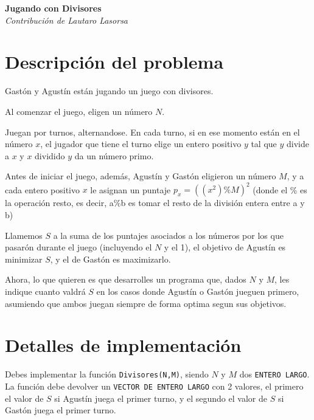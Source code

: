 \documentclass[fontsize=13pt, paper=a4, DIV=calc]{scrartcl}
\renewcommand*{\maketitle}{
	\begin{center}
		\textbf{\nombre}\\
		\textit{\footnotesize Contribución de \author}
	\end{center}
}
\begin{document}
\def\contest{OIA Certamen Nacional Nivel 3}
\def\nombre{Jugando con Divisores}
\def\author{Lautaro Lasorsa}
\def\niveldia{}
\def\numero{}
\def\archivo{divisores}%
\def\version{}


\maketitle
\begin{multicols*}{2}

\section{Descripción del problema}

Gastón y Agustín están jugando un juego con divisores.

Al comenzar el juego, eligen un número $N$. 

Juegan por turnos, alternandose. En cada turno, si en ese momento están en el número $x$, el jugador que tiene el turno elige un entero positivo $y$ tal que $y$ divide a $x$ y $x$ dividido $y$ da un número primo.

Antes de iniciar el juego, además, Agustín y Gastón eligieron un número $M$, y a cada entero positivo $x$ le asignan un puntaje $ p_x = ((x^2)\%M)^2 $ (donde el  \% es la operación resto, es decir, a\%b es tomar el resto de la división entera entre a y b)

Llamemos $S$ a la suma de los puntajes asociados a los números por los que pasarón durante el juego (incluyendo el $N$ y el 1), el objetivo de Agustín es minimizar $S$, y el de Gastón es maximizarlo.

Ahora, lo que quieren es que desarrolles un programa que, dados $N$ y $M$, les indique cuanto valdrá $S$ en los casos donde Agustín o Gastón jueguen primero, asumiendo que ambos juegan siempre de forma optima segun sus objetivos.

\section{Detalles de implementación}
Debes implementar la función \texttt{Divisores(N,M)}, siendo $N$ y $M$ dos \texttt{ENTERO LARGO}. La función debe devolver un \texttt{VECTOR DE ENTERO LARGO} con 2 valores, el primero el valor de $S$ si Agustín juega el primer turno, y el segundo el valor de $S$ si Gastón juega el primer turno.


\end{multicols*}
\end{document}
